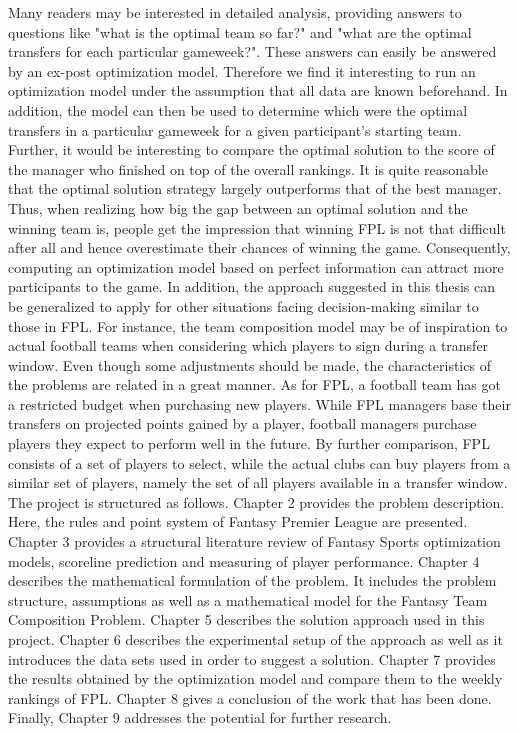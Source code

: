 Many readers may be interested in detailed analysis, providing answers to questions like "what is the optimal team so far?" and "what are the optimal transfers for each particular gameweek?". These answers can easily be answered by an ex-post optimization model. Therefore we find it interesting to run an optimization model under the assumption that all data are known beforehand. In addition, the model can then be used to determine which were the optimal transfers in a particular gameweek for a given participant's starting team. Further, it would be interesting to compare the optimal solution to the score of the manager who finished on top of the overall rankings. It is quite reasonable that the optimal solution strategy largely outperforms that of the best manager. Thus, when realizing how big the gap between an optimal solution and the winning team is, people get the impression that winning FPL is not that difficult after all and hence overestimate their chances of winning the game. Consequently, computing an optimization model based on perfect information can attract more participants to the game.
\newpar
In addition, the approach suggested in this thesis can be generalized to apply for other situations facing decision-making similar to those in FPL. For instance, the team composition model may be of inspiration to actual football teams when considering which players to sign during a transfer window. Even though some adjustments should be made, the characteristics of the problems are related in a great manner. As for FPL, a football team has got a restricted budget when purchasing new players. While FPL managers base their transfers on projected points gained by a player, football managers purchase players they expect to perform well in the future. By further comparison, FPL consists of a set of players to select, while the actual clubs can buy players from a similar set of players, namely the set of all players available in a transfer window.
\newpar
The project is structured as follows. Chapter 2 provides the problem description. Here, the rules and point system of Fantasy Premier League are presented. Chapter 3 provides a structural literature review of Fantasy Sports optimization models, scoreline prediction and measuring of player performance. Chapter 4 describes the mathematical formulation of the problem. It includes the problem structure, assumptions as well as a mathematical model for the Fantasy Team Composition Problem. Chapter 5 describes the solution approach used in this project. Chapter 6 describes the experimental setup of the approach as well as it introduces the data sets used in order to suggest a solution. Chapter 7 provides the results obtained by the optimization model and compare them to the weekly rankings of FPL. Chapter 8 gives a conclusion of the work that has been done. Finally, Chapter 9 addresses the potential for further research.

